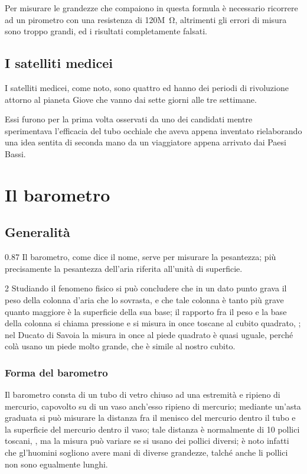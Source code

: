 \documentclass[%
    corpo=11pt,
    twoside,
    greek,
    evenboxes,
    tipotesi=secondaria,
]{toptesi}
\begin{document}
Per misurare le grandezze che compaiono in questa formula \`e necessario
ricorrere ad un pirometro con una resistenza di 120\unit{M\ohm}, altrimenti gli
errori di misura sono troppo grandi, ed i risultati completamente falsati.

\section{I satelliti medicei}
I satelliti medicei, come noto, sono quattro ed hanno dei periodi di rivoluzione
attorno al pianeta Giove che vanno dai sette giorni alle tre settimane.

Essi furono per la prima volta osservati da uno dei candidati mentre
sperimentava l'efficacia del tubo occhiale che aveva appena inventato
rielaborando una idea sentita di seconda mano da un viaggiatore appena arrivato
dai Paesi Bassi.





\chapter{Il barometro}
\section{Generalit\`a}
\begin{interlinea}{0.87} Il barometro, come dice il nome, serve per
misurare la pesantezza; pi\`u precisamente la pesantezza dell'aria
riferita all'unit\`a di superficie.
\end{interlinea}

\begin{interlinea}{2} Studiando il fenomeno fisico si pu\`o concludere
che in un dato punto grava il peso della colonna d'aria che lo
sovrasta, e che tale colonna \`e tanto pi\`u grave quanto maggiore
\`e la superficie della sua base; il rapporto fra il peso e la base
della colonna si chiama pressione e si misura in once toscane al cubito
quadrato, \cite{tor1}; nel Ducato di Savoia la misura in once al piede
quadrato \`e quasi uguale, perch\'e col\`a usano un piede molto
grande, che \`e simile al nostro cubito.
\end{interlinea}

\subsection{Forma del barometro}
Il barometro consta di un tubo di vetro chiuso ad una estremit\`a e
ripieno di mercurio, capovolto su di un vaso anch'esso ripieno di
mercurio; mediante un'asta graduata si pu\`o misurare la distanza fra
il menisco del mercurio dentro il tubo e la superficie del mercurio
dentro il vaso; tale distanza \`e normalmente di 10 pollici toscani,
\cite{tor1,tor2}, ma la misura pu\`o variare se si usano dei pollici
diversi; \`e noto infatti che gl'huomini sogliono avere mani di
diverse grandezze, talch\'e anche li pollici non sono egualmente
lunghi.
\end{document}
